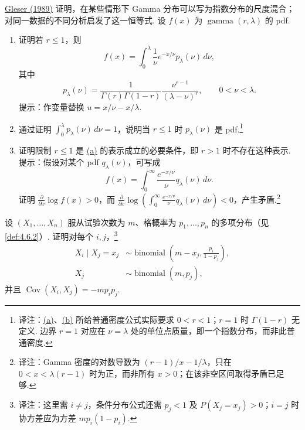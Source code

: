 \begin{exercise}\label{exercise:4.38}
\hyperref[bib:source146]{Gleser (1989)} 证明，在某些情形下 Gamma 分布可以写为指数分布的尺度混合；对同一数据的不同分析启发了这一恒等式. 设 $f(x)$ 为 $\operatorname{gamma}(r,\lambda)$ 的 pdf.
\begin{enumerate}
\item[(a)]\label{itm:exercise:4.38:a} 证明若 $r\le1$，则
$$f(x)=\int_0^\lambda\frac1\nu e^{-x/\nu}p_\lambda(\nu)\,d\nu,$$
其中
$$p_\lambda(\nu)=\frac1{\Gamma(r)\Gamma(1-r)}\frac{\nu^{r-1}}{(\lambda-\nu)^r},\qquad0<\nu<\lambda.$$
提示：作变量替换 $u=x/\nu-x/\lambda$.
\item[(b)]\label{itm:exercise:4.38:b} 通过证明 $\int_0^\lambda p_\lambda(\nu)\,d\nu=1$，说明当 $r\le1$ 时 $p_\lambda(\nu)$ 是 pdf.\footnote{译注：\hyperref[itm:exercise:4.38:a]{(a)}、\hyperref[itm:exercise:4.38:b]{(b)} 所给普通密度公式实际要求 $0<r<1$；$r=1$ 时 $\Gamma(1-r)$ 无定义. 边界 $r=1$ 对应在 $\nu=\lambda$ 处的单位点质量，即一个指数分布，而非此普通密度.}
\item[(c)] 证明限制 $r\le1$ 是 \hyperref[itm:exercise:4.38:a]{(a)} 的表示成立的必要条件，即 $r>1$ 时不存在这种表示. 提示：假设对某个 pdf $q_\lambda(\nu)$，可写成
$$f(x)=\int_0^\infty\frac{e^{-x/\nu}}\nu q_\lambda(\nu)\,d\nu.$$
证明 $\frac\partial{\partial x}\log f(x)>0$，而 $\frac\partial{\partial x}\log\left(\int_0^\infty\frac{e^{-x/\nu}}\nu q_\lambda(\nu)\,d\nu\right)<0$，产生矛盾.\footnote{译注：Gamma 密度的对数导数为 $(r-1)/x-1/\lambda$，只在 $0<x<\lambda(r-1)$ 时为正，而非所有 $x>0$；在该非空区间取得矛盾已足够.}
\end{enumerate}
\end{exercise}
\begin{exercise}\label{exercise:4.39}
设 $(X_1,\ldots,X_n)$ 服从试验次数为 $m$、格概率为 $p_1,\ldots,p_n$ 的多项分布（见\autoref{def:4.6.2}）. 证明对每个 $i,j$，\footnote{译注：这里需 $i\ne j$，条件分布公式还需 $p_j<1$ 及 $P(X_j=x_j)>0$；$i=j$ 时协方差应为方差 $mp_i(1-p_i)$.}
$$\begin{aligned}X_i\mid X_j=x_j&\sim\operatorname{binomial}\left(m-x_j,\frac{p_i}{1-p_j}\right),\\X_j&\sim\operatorname{binomial}(m,p_j),\end{aligned}$$
并且 $\operatorname{Cov}(X_i,X_j)=-mp_ip_j$.
\end{exercise}
